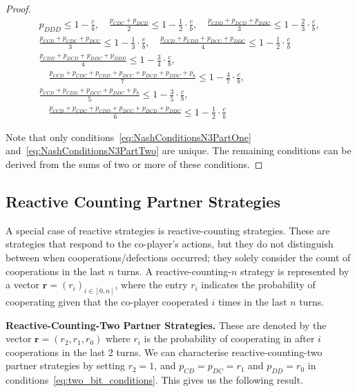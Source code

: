 \documentclass{article}
\theoremstyle{definition}
\begin{document}
\begin{proof}
\begin{align}
  p_{DDD} \leq 1 \!- \!\frac{c}{b},
  \quad \frac{p_{CDC} + p_{DCD}}{2} \leq 1 - \frac{1}{2} \cdot \frac{c}{b}, 
  \quad \frac{p_{CDD} + p_{DCD} + p_{DDC}}{3} \leq 1 - \frac{2}{3} \cdot \frac{c}{b}, \label{eq:NashConditionsN3PartOne} \\[.5em]
  \frac{p_{CCD} + p_{CDC} + p_{DCC}}{3} \leq 1 - \frac{1}{3} \cdot \frac{c}{b},
  \quad \frac{p_{CCD} + p_{CDD} + p_{DCC} + p_{DDC}}{4} \leq 1 - \frac{1}{2}  \cdot \frac{c}{b} \label{eq:NashConditionsN3PartTwo} \\[.5em]
  \frac{p_{CDD} + p_{DCD} + p_{DDC} + p_{DDD}}{4} \leq 1 - \frac{3}{4} \cdot \frac{c}{b}, \\[.5em]
  \quad \frac{p_{CCD} + p_{CDC} + p_{CDD} + p_{DCC} + p_{DCD} + p_{DDC} + p_{8}}{7} \leq 1 - \frac{4}{7} \cdot \frac{c}{b}, \\[.5em]
  \frac{p_{CCD} + p_{CDD} + p_{DCC} + p_{DDC} + p_{8}}{5} \leq 1 - \frac{3}{5} \cdot \frac{c}{b}, \\[.5em]
  \quad \frac{p_{CCD} + p_{CDC} + p_{CDD} + p_{DCC} + p_{DCD} + p_{DDC}}{6} \leq 1 - \frac{1}{2} \cdot \frac{c}{b}
\end{align}

Note that only conditions~\eqref{eq:NashConditionsN3PartOne}
and~\eqref{eq:NashConditionsN3PartTwo} are unique. The remaining conditions can
be derived from the sums of two or more of these conditions.
\end{proof}


\subsection{Reactive Counting Partner Strategies}

A special case of reactive strategies is reactive-counting strategies. These are
strategies that respond to the co-player's actions, but they do not distinguish
between when cooperations/defections occurred; they solely consider the count of
cooperations in the last $n$ turns. A reactive-counting-$n$ strategy is represented
by a vector $\mathbf{r}=(r_i)_{i \in [0, n]}$, where the entry \(r_i\)
indicates the probability of cooperating given that the co-player cooperated
\(i\) times in the last \(n\) turns.

{\bf Reactive-Counting-Two Partner Strategies.} These are denoted by the vector
$\mathbf{r}=(r_2, r_1, r_0)$ where $r_i$ is the probability of cooperating in
after $i$ cooperations in the last 2 turns. We can characterise reactive-counting-two
partner strategies by setting $r_2 = 1$, and $p_{CD} = p_{DC} = r_1$ and $p_{DD} = r_0$
in conditions~\eqref{eq:two_bit_conditions}. This gives us the following result.
\end{document}
